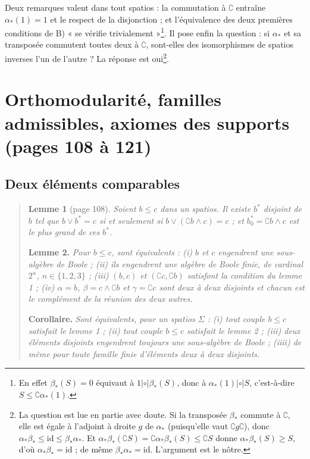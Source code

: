 \documentclass[11pt,a4paper]{article}
\begin{document}
Deux remarques valent dans tout spatios : la commutation à $\complement$ entraîne
$\alpha_{*}(1) = 1$ et le respect de la disjonction ; et l'équivalence des deux
premières conditions de B) « se vérifie trivialement »\footnote{En effet
$\beta_{*}(S) = 0$ équivaut à $1 \mathrel{|\circ|} \beta_{*}(S)$, donc à
$\alpha_{*}(1) \mathrel{|\circ|} S$, c'est-à-dire $S \leq
\complement\alpha_{*}(1)$.}. Il pose enfin la question : si $\alpha_{*}$ et sa
transposée commutent toutes deux à $\complement$, sont-elles des isomorphismes de
spatios inverses l'un de l'autre ? La réponse est oui\footnote{La question est lue
en partie avec doute. Si la transposée $\beta_{*}$ commute à $\complement$, elle
est égale à l'adjoint à droite $g$ de $\alpha_{*}$ (puisqu'elle vaut $\complement
g \complement$), donc $\alpha_{*}\beta_{*} \leq \mathrm{id} \leq
\beta_{*}\alpha_{*}$. Et $\alpha_{*}\beta_{*}(\complement S) =
\complement\alpha_{*}\beta_{*}(S) \leq \complement S$ donne $\alpha_{*}\beta_{*}(S)
\geq S$, d'où $\alpha_{*}\beta_{*} = \mathrm{id}$ ; de même $\beta_{*}\alpha_{*} =
\mathrm{id}$. L'argument est le nôtre.}.

\section*{Orthomodularité, familles admissibles, axiomes des supports (pages 108 à 121)}

\subsection*{Deux éléments comparables}

\begin{quote}
\textbf{Lemme 1} (page 108). \emph{Soient $b \leq c$ dans un spatios. Il existe
$b^{*}$ disjoint de $b$ tel que $b \vee b^{*} = c$ si et seulement si $b \vee
(\complement b \wedge c) = c$ ; et $b^{*}_{0} = \complement b \wedge c$ est le plus
grand de ces $b^{*}$.}

\textbf{Lemme 2.} \emph{Pour $b \leq c$, sont équivalents : (i) $b$ et $c$
engendrent une sous-algèbre de Boole ; (ii) ils engendrent une algèbre de Boole
finie, de cardinal $2^{n}$, $n \in \{1, 2, 3\}$ ; (iii) $(b, c)$ et $(\complement
c, \complement b)$ satisfont la condition du lemme 1 ; (iv) $\alpha = b$, $\beta =
c \wedge \complement b$ et $\gamma = \complement c$ sont deux à deux disjoints et
chacun est le complément de la réunion des deux autres.}

\textbf{Corollaire.} \emph{Sont équivalents, pour un spatios $\Sigma$ : (i) tout
couple $b \leq c$ satisfait le lemme 1 ; (ii) tout couple $b \leq c$ satisfait le
lemme 2 ; (iii) deux éléments disjoints engendrent toujours une sous-algèbre de
Boole ; (iiii) de même pour toute famille finie d'éléments deux à deux
disjoints.}
\end{quote}
\end{document}

